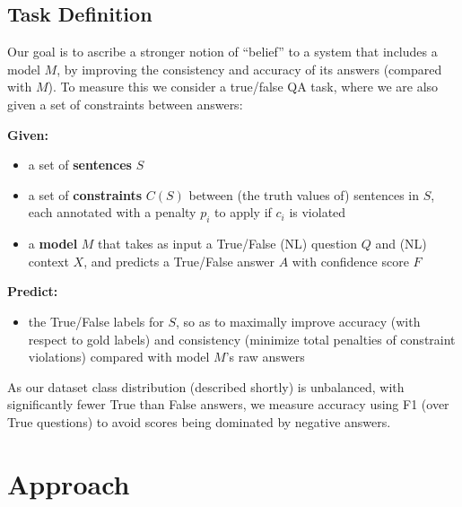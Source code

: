 \documentclass[11pt]{article}
\newcommand{\eat}[1]{}
\newcommand{\red}[1]{\textcolor{red}{#1}}
\newenvironment{myquote}{                   %
  \parskip 0mm \begin{quoting}[vskip=0mm,leftmargin=2mm]}{
\end{quoting}}
\newenvironment{ite}{                     %
     \parskip 0cm \begin{itemize} \parskip 0cm \parsep 0cm \itemsep 0cm \topsep 0cm}{
        \end{itemize}} %
\begin{document}
\eat{
\red{Possibly delete this paragraph if too repetitive.} 
As has been shown elsewhere, language models (LM) can be inconsistent in their answers,
suggesting they have a rather weak notion of belief, in the sense described above.
To strengthen this, we add a dynamic memory component - the BeliefBank - on top of
the model to track and modify beliefs. We use the phrase ``the {\bf system}'' to refer
to the combined model plus belief bank. Our goal is to create a system with
a stronger notion of belief (i.e., more consistent and accurate) than the underlying LM inside it.
}

\subsection{Task Definition}

Our goal is to ascribe a stronger notion of ``belief'' to a system that includes a model $M$,
by improving the consistency and accuracy of its answers (compared with $M$). To measure
this we consider a true/false QA task, where we are also given a set of
constraints between answers:
\begin{myquote}
{\bf Given:}
\begin{ite}
\item a set of {\bf sentences} $S$ 
\item a set of {\bf constraints} $C(S)$ between (the truth values of) sentences in $S$, each annotated with a penalty $p_i$ to apply if $c_i$ is violated
\item a {\bf model} $M$ that takes as input a True/False (NL) question $Q$ and (NL) context $X$, and predicts a True/False answer $A$ with confidence score $F$
\end{ite}
{\bf Predict:}
\begin{ite}
\item the True/False labels for $S$, so as to maximally improve accuracy (with respect to gold labels) and
   consistency (minimize total penalties of constraint violations) compared with model $M$'s raw answers
\end{ite}
\end{myquote}
As our dataset class distribution (described shortly) is unbalanced, with significantly fewer True than False
answers, we measure accuracy using F1 (over True questions) to avoid scores being dominated by negative
answers.



\section{Approach}
\end{document}
